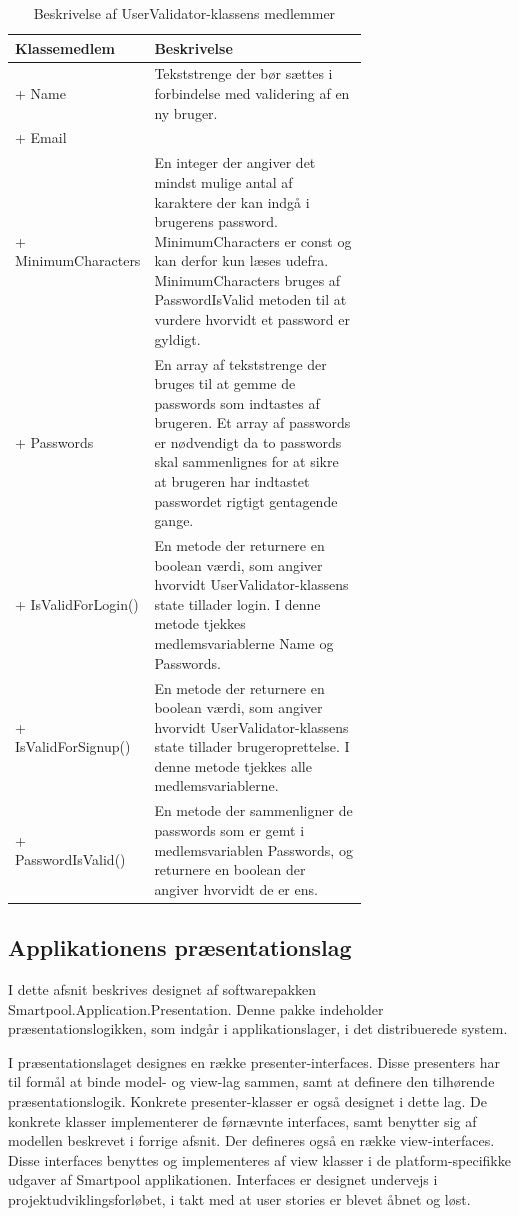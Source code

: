 \begin{table}
	\centering
	\begin{tabular}{| l | p{0.7\linewidth} |}
		\toprule
		\textbf{Klassemedlem}	& \textbf{Beskrivelse} \\
		\midrule
		+ Name				& Tekststrenge der bør sættes i forbindelse med validering af en ny bruger.	\\
		+ Email 			& 	\\\hline
		+ MinimumCharacters  				& En integer der angiver det mindst mulige antal af karaktere der kan indgå i brugerens password. MinimumCharacters er const og kan derfor kun læses udefra. MinimumCharacters bruges af PasswordIsValid metoden til at vurdere hvorvidt et password er gyldigt. \\\hline
		+ Passwords  			& En array af tekststrenge der bruges til at gemme de passwords som indtastes af brugeren. Et array af passwords er nødvendigt da to passwords skal sammenlignes for at sikre at brugeren har indtastet passwordet rigtigt gentagende gange.\\\hline
		+ IsValidForLogin() 				& En metode der returnere en boolean værdi, som angiver hvorvidt UserValidator-klassens state tillader login. I denne metode tjekkes medlemsvariablerne Name og Passwords. \\\hline
		+ IsValidForSignup() 			& En metode der returnere en boolean værdi, som angiver hvorvidt UserValidator-klassens state tillader brugeroprettelse. I denne metode tjekkes alle medlemsvariablerne.
 \\\hline
		+ PasswordIsValid()				& En metode der sammenligner de passwords som er gemt i medlemsvariablen Passwords, og returnere en boolean der angiver hvorvidt de er ens. \\
		\bottomrule
		\end{tabular}
	\caption{Beskrivelse af UserValidator-klassens medlemmer}
	\label{tab:table_design_uservalidator}	
\end{table}

\subsection{Applikationens præsentationslag}
I dette afsnit beskrives designet af softwarepakken Smartpool.Application.Presentation. Denne pakke indeholder præsentationslogikken, som indgår i applikationslager, i det distribuerede system.

I præsentationslaget designes en række presenter-interfaces. Disse presenters har til formål at binde model- og view-lag sammen, samt at definere den tilhørende præsentationslogik. Konkrete presenter-klasser er også designet i dette lag. De konkrete klasser implementerer de førnævnte interfaces, samt benytter sig af modellen beskrevet i forrige afsnit. Der defineres også en række view-interfaces. Disse interfaces benyttes og implementeres af view klasser i de platform-specifikke udgaver af Smartpool applikationen. Interfaces er designet undervejs i projektudviklingsforløbet, i takt med at user stories er blevet åbnet og løst.

